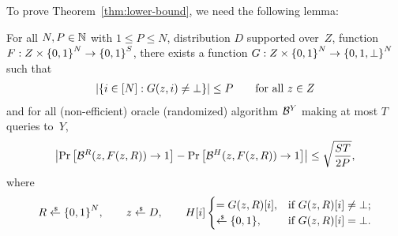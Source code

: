 \noindent
To prove Theorem~\ref{thm:lower-bound}, we need the following lemma:

\begin{lemma}\label{lem:ai-rom}
For all ${N,P\in{\mathbb{N}}}$ with ${1\leq P\leq N}$,
distribution $D$ supported over~$Z$,
function ${F:Z\times{\{0,1\}}^N\to{\{0,1\}}^S}$,
there exists a function ${G:Z\times\bit^N\to{\{0,1,\bot\}}^N}$ such that
\begin{align*}
|\{{i\in[N]}:{G(z,i)\neq\bot}\}|\leq P
\qquad\textup{for all }z\in Z
\end{align*}
and for all (non-efficient) oracle (randomized) algorithm ${\mathcal{B}}^Y$ making at most $T$ queries to~$Y$,
\begin{align*}
\left|
\Pr\left[{\mathcal{B}}^R(z,F(z,R))\to 1\right]
-
\Pr\left[{\mathcal{B}}^H(z,F(z,R))\to 1\right]
\right|
\leq
\sqrt{\frac{ST}{2P}},
\end{align*}
where
\begin{align*}
R\draws\bit^N,\qquad
z\draws D,\qquad
H[i]\begin{cases}
=G(z,R)[i],&\textup{if }G(z,R)[i]\neq\bot;\\
\draws\bit,&\textup{if }G(z,R)[i]=\bot.
\end{cases}
\end{align*}
\end{lemma}

